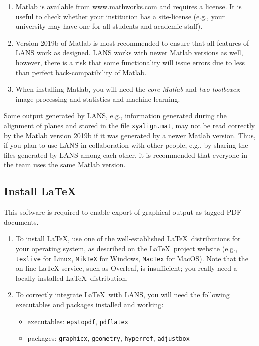 \documentclass[a4paper, 11pt]{article}
\newcommand{\ttt}[1]{\texttt{#1}}
\newcommand\mnote{\marginnote{\fbox{\textbf{\bf Note}}}}
\begin{document}
\begin{enumerate}

\item Matlab is available from \url{www.mathworks.com} and requires a license. It is useful to check whether your institution has a site-license (e.g., your university may have one for all students and academic staff). 

\item Version 2019b of Matlab is most recommended to ensure that all features of LANS work as designed. LANS works with newer Matlab versions as well, however, there is a risk that some functionality will issue errors due to less than perfect back-compatibility of Matlab.

\item When installing Matlab, you will need the \emph{core Matlab} and \emph{two toolboxes}: image processing and statistics and machine learning. 

\end{enumerate}

\mnote
Some output generated by LANS, e.g., information generated during the alignment of planes and stored in the file \ttt{xyalign.mat}, may not be read correctly by the Matlab version 2019b if it was generated by a newer Matlab version. Thus, if you plan to use LANS in collaboration with other people, e.g., by sharing the files generated by LANS among each other, it is recommended that everyone in the team uses the same Matlab version.


\subsection{Install \LaTeX}

This software is required to enable export of graphical output as tagged PDF documents. 

\begin{enumerate}
 
\item To install \LaTeX, use one of the well-established \LaTeX\ distributions for your operating system, as described on the \href{https://www.latex-project.org/get/}{\LaTeX\ project} website (e.g., \ttt{texlive} for Linux, \ttt{MikTeX} for Windows, \ttt{MacTex} for MacOS). Note that the on-line LaTeX service, such as Overleaf, is insufficient; you really need a locally installed \LaTeX\ distribution.
 
\item To correctly integrate \LaTeX\ with LANS, you will need the following executables and packages installed and working:
 
\begin{itemize}
\item executables: \ttt{epstopdf}, \ttt{pdflatex}
\item packages: \ttt{graphicx}, \ttt{geometry}, \ttt{hyperref}, \ttt{adjustbox}
\end{itemize}
 
\end{enumerate}
 
\end{document}
